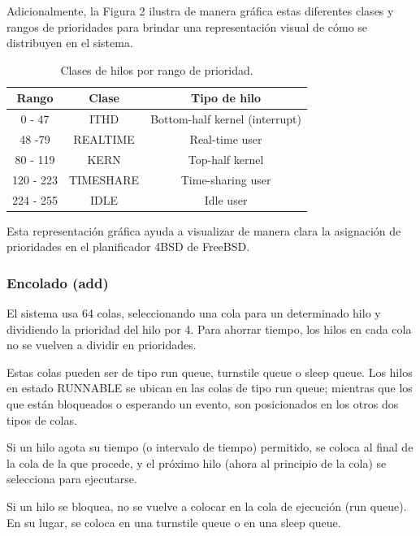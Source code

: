 Adicionalmente, la Figura 2 ilustra de manera gráfica estas diferentes clases y rangos de prioridades para brindar una representación visual de cómo se distribuyen en el sistema.\par

\begin{table}[H]
    \centering
    \begin{tabular}{|c|c|c|}
        \hline
        \textbf{Rango} & \textbf{Clase} & \textbf{Tipo de hilo} \\
        \hline
        0 - 47 & ITHD & Bottom-half kernel (interrupt) \\
        \hline
        48 -79 & REALTIME & Real-time user \\
        \hline
        80 - 119 & KERN & Top-half kernel \\
        \hline
        120 - 223 & TIMESHARE & Time-sharing user \\
        \hline
        224 - 255 & IDLE & Idle user \\
        \hline
    \end{tabular}
    \caption{Clases de hilos por rango de prioridad.}
    \label{tabla:prio_hilos}
\end{table}

Esta representación gráfica ayuda a visualizar de manera clara la asignación de prioridades en el planificador 4BSD de FreeBSD.\par

\subsubsection{Encolado (add)}
El sistema usa 64 colas, seleccionando una cola para un determinado hilo y dividiendo la prioridad del hilo por 4. Para ahorrar tiempo, los hilos en cada cola no se vuelven a dividir en prioridades.\par

Estas colas pueden ser de tipo run queue, turnstile queue o sleep queue. Los hilos en estado RUNNABLE se ubican en las colas de tipo run queue; mientras que los que están bloqueados o esperando un evento, son posicionados en los otros dos tipos de colas.\par

Si un hilo agota su tiempo (o intervalo de tiempo) permitido, se coloca al final de la cola de la que procede, y el próximo hilo (ahora al principio de la cola) se selecciona para ejecutarse.\par

Si un hilo se bloquea, no se vuelve a colocar en la cola de ejecución (run queue). En su lugar, se coloca en una turnstile queue o en una sleep queue.\par

